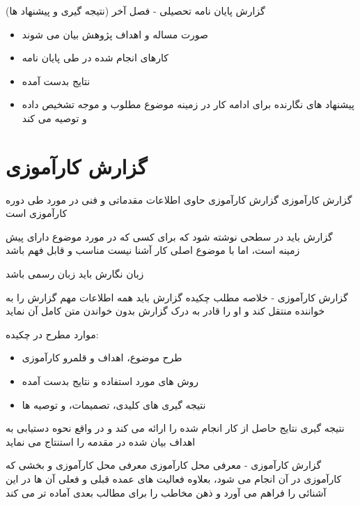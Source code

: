 \documentclass[14pt]{beamer}
\makeatletter
\newcommand{\rtlist}{\raggedleft\rightskip\@totalleftmargin}
\newcommand{\sectionfontsize}{\fontsize{22pt}{0pt}\selectfont}
\newcommand{\framefontsizelarge}{\fontsize{18pt}{0pt}\selectfont}
\newcommand{\frametitlefontsize}{\fontsize{20pt}{0pt}\selectfont}
\makeatother
\begin{document}
\begin{persian}
\begin{frame}[plain]{\frametitlefontsize گزارش پایان نامه تحصیلی - فصل آخر (نتیجه گیری و پیشنهاد ها)}
		\begin{itemize}\rtlist
			\item صورت مساله و اهداف پژوهش بیان می شوند
			\item کارهای انجام شده در طی پایان نامه 
			\item نتایج بدست آمده
			\item پیشنهاد های نگارنده برای ادامه کار در زمینه موضوع مطلوب و موجه تشخیص داده و توصیه می کند
		\end{itemize}
		
	\end{frame}	

	\section{\sectionfontsize گزارش کارآموزی}	

	\begin{frame}[plain]{\frametitlefontsize گزارش کارآموزی}
		\framefontsizelarge
		گزارش کارآموزی حاوی اطلاعات مقدماتی و فنی در مورد طی دوره کارآموزی است
		
		گزارش باید در سطحی نوشته شود که برای کسی که در مورد موضوع دارای پیش زمینه است، اما با موضوع اصلی کار آشنا نیست مناسب و قابل فهم باشد
		
		زبان نگارش باید زبان رسمی باشد
	\end{frame}	
	
	\begin{frame}[plain]{\frametitlefontsize گزارش کارآموزی - خلاصه مطلب}
		\framefontsizelarge
		چکیده گزارش باید همه اطلاعات مهم گزارش را به خواننده منتقل کند و او را قادر به درک گزارش بدون خواندن متن کامل آن نماید
		
		موارد مطرح در چکیده: 
		\begin{itemize}\rtlist
			\item طرح موضوع، اهداف و قلمرو کارآموزی
			\item روش های مورد استفاده و نتایج بدست آمده
			\item نتیجه گیری های کلیدی، تصمیمات، و توصیه ها
		\end{itemize}
		\persian
		نتیجه گیری نتایج حاصل از کار انجام شده را ارائه می کند و در واقع نحوه دستیابی به اهداف بیان شده در مقدمه را استنتاج می نماید
	\end{frame}	
	
	\begin{frame}[plain]{\frametitlefontsize گزارش کارآموزی - معرفی محل کارآموزی}
		\framefontsizelarge
		معرفی محل کارآموزی و بخشی که کارآموزی در آن انجام می شود، بعلاوه فعالیت های عمده قبلی و فعلی آن ها در این آشنائی را فراهم می آورد و ذهن مخاطب را برای مطالب بعدی آماده تر می کند
	\end{frame}	
	

\end{persian}
\end{document}
